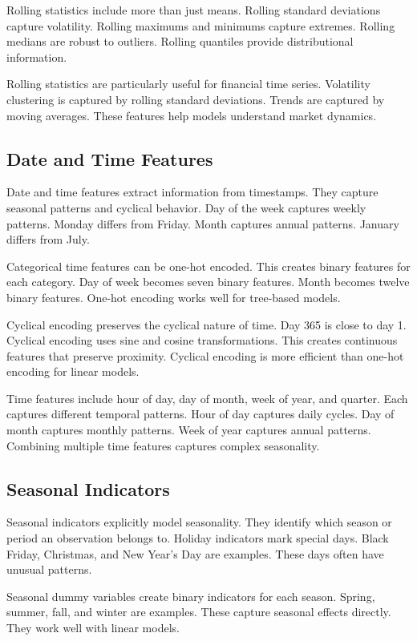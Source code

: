 Rolling statistics include more than just means. Rolling standard deviations capture volatility. Rolling maximums and minimums capture extremes. Rolling medians are robust to outliers. Rolling quantiles provide distributional information.

Rolling statistics are particularly useful for financial time series. Volatility clustering is captured by rolling standard deviations. Trends are captured by moving averages. These features help models understand market dynamics.

\subsection{Date and Time Features}

Date and time features extract information from timestamps. They capture seasonal patterns and cyclical behavior. Day of the week captures weekly patterns. Monday differs from Friday. Month captures annual patterns. January differs from July.

Categorical time features can be one-hot encoded. This creates binary features for each category. Day of week becomes seven binary features. Month becomes twelve binary features. One-hot encoding works well for tree-based models.

Cyclical encoding preserves the cyclical nature of time. Day 365 is close to day 1. Cyclical encoding uses sine and cosine transformations. This creates continuous features that preserve proximity. Cyclical encoding is more efficient than one-hot encoding for linear models.

Time features include hour of day, day of month, week of year, and quarter. Each captures different temporal patterns. Hour of day captures daily cycles. Day of month captures monthly patterns. Week of year captures annual patterns. Combining multiple time features captures complex seasonality.

\subsection{Seasonal Indicators}

Seasonal indicators explicitly model seasonality. They identify which season or period an observation belongs to. Holiday indicators mark special days. Black Friday, Christmas, and New Year's Day are examples. These days often have unusual patterns.

Seasonal dummy variables create binary indicators for each season. Spring, summer, fall, and winter are examples. These capture seasonal effects directly. They work well with linear models.

